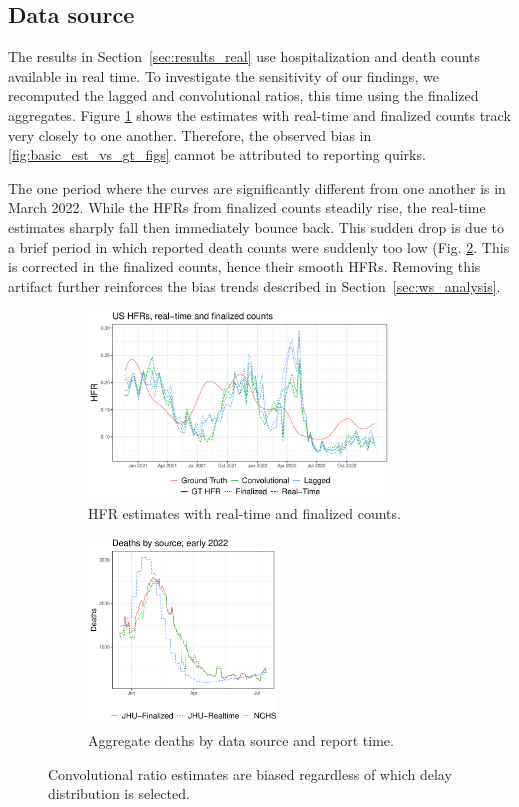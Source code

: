 \documentclass{article}
\begin{document}
\subsection{Data source}
The results in Section~\ref{sec:results_real} use hospitalization and death counts available in real time. To investigate the sensitivity of our findings, we recomputed the lagged and convolutional ratios, this time using the finalized aggregates. Figure \ref{fig:rt_and_final} shows the estimates with real-time and finalized counts track very closely to one another. Therefore, the observed bias in \ref{fig:basic_est_vs_gt_figs} cannot be attributed to reporting quirks.

The one period where the curves are significantly different from one another is in March 2022. While the HFRs from finalized counts steadily rise, the real-time estimates sharply fall then immediately bounce back. This sudden drop is due to a brief period in which reported death counts were suddenly too low (Fig. \ref{fig:source}. This is corrected in the finalized counts, hence their smooth HFRs. Removing this artifact further reinforces the bias trends described in Section~\ref{sec:ws_analysis}.

\begin{figure}
     \centering
     \begin{subfigure}[b]{0.45\linewidth}
         \centering
         \includegraphics[height=5cm]{Figures/Real/US_ests_realtime_both.pdf}
         \caption{HFR estimates with real-time and finalized counts.}
         \label{fig:rt_and_final}
     \end{subfigure}
     \hfill
     \begin{subfigure}[b]{0.45\linewidth}
         \centering
         \includegraphics[height=5cm]{Figures/Real/death_curves.pdf}
         \caption{Aggregate deaths by data source and report time.}
         \label{fig:source}
     \end{subfigure}
        \caption{Convolutional ratio estimates are biased regardless of which delay distribution is selected.}
        \label{fig:real_time_vs_finalized}
\end{figure}
\end{document}
